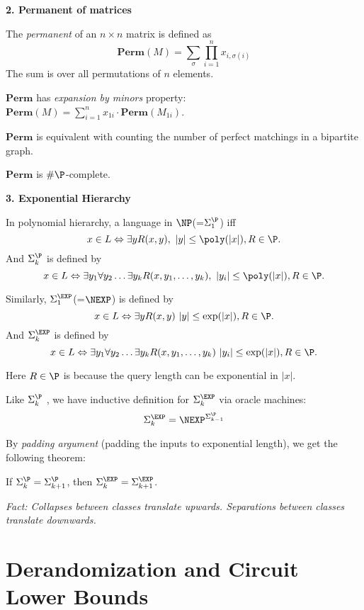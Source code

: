 \documentclass[letterpaper, 12pt]{article}
\newcommand{\Perm}{\mathbf{Perm}}
\begin{document}
\bigskip

\noindent \textbf{2. Permanent of matrices}

The \emph{permanent} of an $n \times n$ matrix is defined as
\[\Perm (M) = \sum_{\sigma} \prod_{i=1}^{n} x_{i, \sigma(i)}\]
The sum is over all permutations of $n$ elements.

$\Perm$ has \emph{expansion by minors} property: $\Perm(M) = \sum_{i = 1}^n x_{1i} \cdot \Perm(M_{1i})$.

$\Perm$ is equivalent with counting the number of perfect matchings in a bipartite graph.

\begin{theorem}[Valiant]
	$\Perm$ is $\#\P$-complete.
\end{theorem}

\bigskip

\noindent \textbf{3. Exponential Hierarchy}

In polynomial hierarchy, a language in $\NP$(=$\Sigma_1^\P$) iff
\[x \in L \Leftrightarrow \exists y R(x,y), \ |y| \leq \poly (|x|), R \in \P.\]
And $\Sigma_k^\P$ is defined by
\[x \in L \Leftrightarrow \exists y_1 \forall y_2 \dots \exists y_k R(x,y_1, \dots, y_k), \ |y_i| \leq \poly (|x|), R \in \P.\]

Similarly, $\Sigma_1^\EXP$(=$\NEXP$) is defined by
\[x \in L \Leftrightarrow \exists y R(x,y) \ |y| \leq \exp (|x|), R \in \P.\]
And $\Sigma_k^\EXP$ is defined by \[x \in L \Leftrightarrow \exists y_1 \forall y_2 \dots \exists y_k R(x,y_1, \dots, y_k) \ |y_i| \leq \exp (|x|), R \in \P.\]

Here $R \in \P$ is because the query length can be exponential in $|x|$.

\medskip

Like $\Sigma_k^\P$ , we have inductive definition for $\Sigma_k^\EXP $ via oracle machines:
\[\Sigma_k^\EXP = \NEXP^{\Sigma_{k-1}^\P}\]

By \emph{padding argument} (padding the inputs to exponential length), we get the following theorem:

\begin{theorem}
	If $\Sigma_k^{\P} = \Sigma_{k+1}^{\P}$, then  $\Sigma_k^{\EXP} = \Sigma_{k+1}^{\EXP}$.
\end{theorem}

\emph{Fact: Collapses between classes translate upwards. Separations between classes translate downwards.}

\section{Derandomization and Circuit Lower Bounds}
\end{document}
